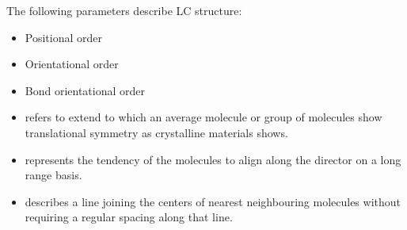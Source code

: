 \documentclass[12pt, a4paper]{article}
\begin{document}
The following parameters describe LC structure:
\begin{itemize}
	\item Positional order
	\item Orientational order
	\item Bond orientational order
\end{itemize}
\medskip
\begin{adjustwidth}{-10pt}{0pt}
	\begin{itemize}
		\item {} refers to extend to which an average molecule or group of molecules show translational symmetry as crystalline materials shows.
		\item {} represents the tendency of the molecules to align along the director on a long range basis.
		\item {} describes a line joining the centers of nearest neighbouring molecules without requiring a regular spacing along that line.
	\end{itemize}
\end{adjustwidth}

\end{document}
